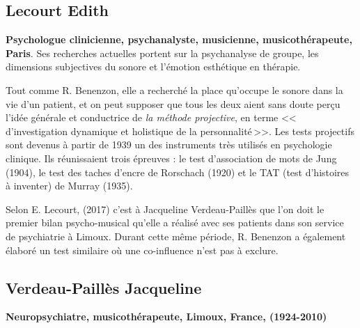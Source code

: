         \subsection{Lecourt Edith}
      \textbf{Psychologue clinicienne,
          psychanalyste, musicienne, musicothérapeute, Paris}. Ses recherches
        actuelles portent sur la psychanalyse de groupe, les
        dimensions subjectives du sonore  et l'émotion esthétique en
        thérapie.
        
   Tout comme R. Benenzon, elle a recherché  la place qu'occupe le sonore dans la vie d'un 
        patient, et on peut supposer que tous les deux aient sans doute perçu l'idée générale et 
        conductrice de \emph{la méthode projective}, 
        en terme 
	    <<\,d'investigation dynamique et holistique de la
            personnalité\,>>.
            Les tests projectifs sont devenus à partir
        de 1939 un des instruments très utilisés en psychologie
        clinique. Ils réunissaient trois épreuves : le test
        d'association de mots de Jung (1904), le test des taches
        d'encre de Rorschach (1920) et le TAT (test d'histoires à
        inventer) de Murray (1935)\autocite[ch.~1, p.~13] {anzieu.chabert:methodes}.

        Selon E. Lecourt,
(2017)\autocite[ch.~3, p.~84]{lecourt_les_2017}
c'est à Jacqueline Verdeau-Paillès que l'on doit le premier bilan
psycho-musical qu'elle a réalisé avec ses patients dans son service
de psychiatrie à Limoux. Durant cette même période, R.
Benenzon a également élaboré un test similaire
\autocite{benenzon:musicotherapie} où une co-influence n'est pas à exclure.


	


\subsection{Verdeau-Paillès Jacqueline
}
\textbf{Neuropsychiatre,
  musicothérapeute, Limoux, France, (1924-2010)}

